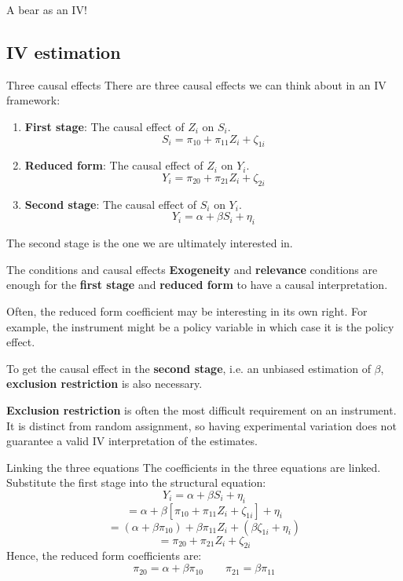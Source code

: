 \documentclass{beamer}
\begin{document}
\begin{frame}{A bear as an IV!}
	\begin{center}
	\end{center}
\end{frame}

\subsection{IV estimation}

\begin{frame}{Three causal effects}
There are three causal effects we can think about in an IV framework:
\begin{enumerate}
\item \textbf{First stage}: The causal effect of $Z_i$ on $S_i$.
\[S_i = \pi_{10} + \pi_{11}Z_i + \zeta_{1i}\]
\item \textbf{Reduced form}: The causal effect of $Z_i$ on $Y_i$.
\[Y_i = \pi_{20} + \pi_{21}Z_i + \zeta_{2i}\]
\item \textbf{Second stage}: The causal effect of $S_i$ on $Y_i$.
\[Y_i = \alpha + \beta S_i + \eta_i \]
\end{enumerate}

The second stage is the one we are ultimately interested in.
\end{frame}

\begin{frame}{The conditions and causal effects}
\textbf{Exogeneity} and \textbf{relevance} conditions are enough for the \textbf{first stage} and \textbf{reduced form} to have a causal interpretation.\bigskip

Often, the reduced form coefficient may be interesting in its own right. For example, the instrument might be a policy variable in which case it is the policy effect.\bigskip

To get the causal effect in the \textbf{second stage}, i.e. an unbiased estimation of $\beta$, \textbf{exclusion restriction} is also necessary.\medskip

\textbf{Exclusion restriction} is often the most difficult requirement on an instrument. It is distinct from random assignment, so having experimental variation does not guarantee a valid IV interpretation of the estimates.
\end{frame}

\begin{frame}{Linking the three equations}
The coefficients in the three equations are linked. Substitute the first stage into the structural equation:
\[Y_i = \alpha + \beta S_i + \eta_i\]
\[= \alpha + \beta [\pi_{10} + \pi_{11}Z_i + \zeta_{1i} ] + \eta_i\]
\[= (\alpha + \beta \pi_{10}) + \beta \pi_{11}Z_i + (\beta\zeta_{1i} + \eta_i )\]
\[= \pi_{20} + \pi_{21}Z_i + \zeta_{2i}\]
Hence, the reduced form coefficients are:
\[\pi_{20} = \alpha + \beta \pi_{10} \qquad \pi_{21} = \beta \pi_{11}\]
\end{frame}
\end{document}
